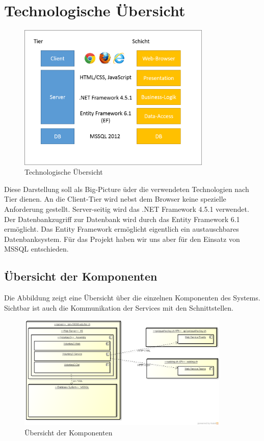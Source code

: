 \chapter{Technologische Übersicht}
	\begin{figure}
  		\vspace{-25pt}
	  	\begin{center}
    		\includegraphics[height=7cm]{content/architekturdokumentation/images/technologische_uebersicht.png}
	  	\end{center}
  		\vspace{-20pt}
	 	\caption{Technologische Übersicht}
	\end{figure}
    Diese Darstellung soll als Big-Picture üder die verwendeten Technologien nach Tier dienen.
    An die Client-Tier wird nebst dem Browser keine spezielle Anforderung gestellt.
  	Server-seitig wird das .NET Framework 4.5.1 verwendet. Der Datenbankzugriff zur Datenbank wird durch das Entity Framework 6.1 ermöglicht. Das Entity Framework ermöglicht eigentlich ein austauschbares Datenbanksystem. Für das Projekt haben wir uns aber für den Einsatz von MSSQL entschieden.
  	\vspace{1.5cm}

	\section{Übersicht der Komponenten}
	Die Abbildung zeigt eine Übersicht über die einzelnen Komponenten des Systems. Sichtbar ist auch die Kommunikation der Services mit den Schnittstellen.
    \begin{figure}[h]
  		\vspace{-5pt}
    	\centering
    	\includegraphics[width=0.9\textwidth]{content/architekturdokumentation/images/uebersicht_der_komponenten.png}
  		\vspace{-25pt}
    	\caption{Übersicht der Komponenten}
	\end{figure}
	